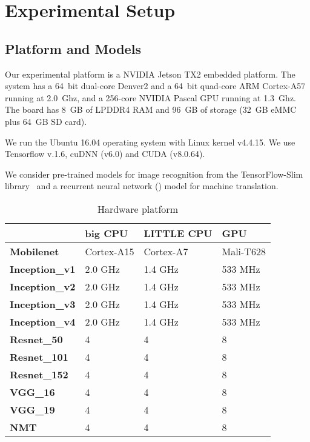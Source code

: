 \section{Experimental Setup \label{sec:setup}}
\subsection{Platform and Models\label{sec:platform}}
 Our experimental platform is a NVIDIA Jetson TX2 embedded platform. The system has a 64~bit dual-core Denver2 and a
64~bit quad-core ARM Cortex-A57 running at 2.0~Ghz, and a 256-core NVIDIA Pascal GPU running at 1.3~Ghz. The board has 8~GB of LPDDR4 RAM
and 96~GB of storage (32~GB eMMC plus 64~GB SD card).


 We run the Ubuntu 16.04 operating system with Linux kernel v4.4.15. We use Tensorflow v.1.6, cuDNN (v6.0) and
CUDA (v8.0.64).


 We consider  pre-trained \CNN models for image recognition from the TensorFlow-Slim
library~\cite{silberman2013tensorflow} and a recurrent neural network (\RNN) model for machine translation. 

\begin{table}[t!]
\begin{center}
\vspace{-1mm}
\caption{Hardware platform}
\vspace{-2mm}
\scriptsize
\label{tbl:config}
\begin{tabular}{llll}
\toprule
&\textbf{big CPU}& \textbf{LITTLE CPU} & \textbf{GPU} \\
\midrule
\textbf{Mobilenet} & Cortex-A15 & Cortex-A7  & Mali-T628 \\
\textbf{Inception_v1} & 2.0 GHz & 1.4 GHz & 533 MHz \\
\textbf{Inception_v2} & 2.0 GHz & 1.4 GHz & 533 MHz \\
\textbf{Inception_v3} & 2.0 GHz & 1.4 GHz & 533 MHz \\
\textbf{Inception_v4} & 2.0 GHz & 1.4 GHz & 533 MHz \\
\textbf{Resnet_50} & 4 & 4 & 8 \\
\textbf{Resnet_101} & 4 & 4 & 8 \\
\textbf{Resnet_152} & 4 & 4 & 8 \\
\textbf{VGG_16} & 4 & 4 & 8 \\
\textbf{VGG_19} & 4 & 4 & 8 \\
\textbf{NMT} & 4 & 4 & 8 \\

\bottomrule
\end{tabular}
\end{center}
\vspace{-6mm}
\end{table}



